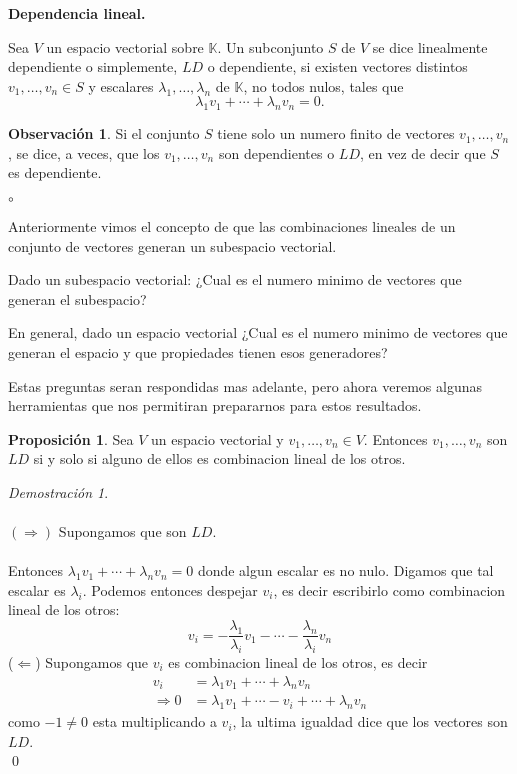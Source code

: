 \documentclass{article}
\theoremstyle{definition}
\theoremstyle{definition}
\newtheorem*{obs}{Observación}
\newtheorem{prop}[teo]{Proposición}
\theoremstyle{remark}
\newtheorem*{demo}{Demostración}
\begin{document}
\begin{center}
\textbf{Dependencia lineal.}
\end{center}
\begin{defi}
  Sea $V$ un espacio vectorial sobre $\mathbb{K}$. Un subconjunto $S$ de $V$ se dice linealmente dependiente o simplemente, $LD$ o dependiente, si existen vectores distintos $v_1, \dots ,v_n \in S$ y escalares $\lambda_1, \dots ,\lambda_n$ de $\mathbb{K}$, no todos nulos, tales que \[
\lambda_1 v_1 + \cdots + \lambda_n v_n =0.
  \]
\end{defi}
\begin{obs}
 Si el conjunto $S$ tiene solo un numero finito de vectores $v_1, \dots, v_n$, se dice, a veces, que los $v_1, \dots, v_n$ son dependientes o $LD$, en vez de decir que $S$ es dependiente.
\end{obs}
\begin{list}{$\circ$}{}  
\item  Anteriormente vimos el concepto de que las combinaciones lineales de un conjunto de vectores generan un subespacio vectorial. 
\item Dado un subespacio vectorial: ¿Cual es el numero minimo de vectores que generan el subespacio? 
\item En general, dado un espacio vectorial ¿Cual es el numero minimo de vectores que generan el espacio y que propiedades tienen esos generadores? 
\end{list}
Estas preguntas seran respondidas mas adelante, pero ahora veremos algunas herramientas que nos permitiran prepararnos para estos resultados.
\begin{prop}
Sea $V$ un espacio vectorial y $v_1, \dots ,v_n \in V$. Entonces $v_1, \dots, v_n$ son $LD$ si y solo si alguno de ellos es combinacion lineal de los otros.
\end{prop}
\begin{demo}
  \;\\\\
  $(\Rightarrow)$ 
  Supongamos que son $LD$.\\\\ Entonces $\lambda_1 v_1 + \cdots + \lambda_n v_n=0$ donde algun escalar es no nulo. Digamos que tal escalar es $\lambda_i$. Podemos entonces despejar $v_i$, es decir escribirlo como combinacion lineal de los otros: \[
    v_i=-\frac{\lambda_1}{\lambda_i}v_1-\cdots -\frac{\lambda_n}{\lambda_i}v_n
  \]
  ($\Leftarrow$) Supongamos que $v_i$ es combinacion lineal de los otros, es decir \[
    \begin{aligned}
      v_i &= \lambda_1 v_1 + \cdots + \lambda_n v_n \\
\Rightarrow 0 &= \lambda_1 v_1 + \cdots - v_i + \cdots + \lambda_n v_n
    \end{aligned}
  \]
  como $-1 \neq 0$ esta multiplicando a $v_i$, la ultima igualdad dice que los vectores son $LD$. \\ \qed
\end{demo}
\end{document}
